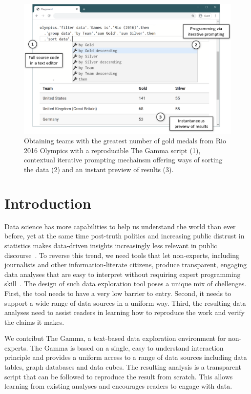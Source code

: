 \documentclass[manuscript,review,anonymous]{acmart}
\begin{document}
\maketitle

\begin{figure}
\includegraphics[width=.58\columnwidth]{figures/thegamma-annot}
\vspace{-0.5em}
\caption{Obtaining teams with the greatest number of gold medals from Rio 2016
Olympics with a reproducible The Gamma script (1), contextual iterative prompting mechainsm
offering ways of sorting the data (2) and an instant preview of results (3).}
\label{fig:thegamma}
\vspace{-0.5em}
\end{figure}


\section{Introduction}
Data science has more capabilities to help us understand the world than ever before, yet at the
same time post-truth politics and increasing public distrust in statistics makes data-driven insights
increasingly less relevant in public discourse~\cite{howstatslost}. To reverse this trend, we
need tools that let non-experts, including journalists and other information-literate citizens,
produce transparent, engaging data analyses that are easy to interpret without requiring expert
programming skill~\cite{ddj}. The design of such data exploration tool poses a unique mix of chellenges.
First, the tool needs to have a very low barrier to entry. Second, it needs to support a wide
range of data sources in a uniform way. Third, the resulting data analyses need to assist
readers in learning how to reproduce the work and verify the claims it makes.

We contribut The Gamma, a text-based data exploration environment for non-experts. The Gamma
is based on a single, easy to understand interaction principle and provides a uniform
access to a range of data sources including data tables, graph databases and data cubes.
The resulting analysis is a transparent script that can be followed to reproduce the
result from scratch. This allows learning from existing analyses and encourages readers
to engage with data.
\end{document}
